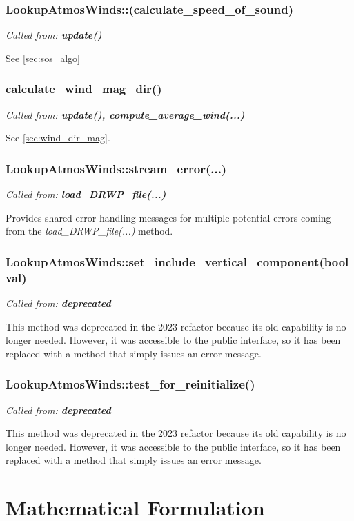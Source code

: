 \documentclass[11pt,fleqn]{report}
\begin{document}
\subsubsection{LookupAtmosWinds::(calculate\_speed\_of\_sound)}
\textit{Called from:  \textbf{update()}}

See \ref{sec:sos_algo}

\subsubsection{calculate\_wind\_mag\_dir()}
\textit{Called from:  \textbf{update(), compute\_average\_wind(...)}}

See \ref{sec:wind_dir_mag}.

\subsubsection{LookupAtmosWinds::stream\_error(...)}
\textit{Called from:  \textbf{load\_DRWP\_file(...)}}

Provides shared error-handling messages for multiple potential errors coming
from the \textit{load\_DRWP\_file(...)} method.

\subsubsection{LookupAtmosWinds::set\_include\_vertical\_component(bool val)}
\textit{Called from:  \textbf{deprecated}}

This method was deprecated in the 2023 refactor because its old capability is
no longer needed. However, it was accessible to the public interface, so it has
been replaced with a method that simply issues an error message.

\subsubsection{LookupAtmosWinds::test\_for\_reinitialize()}
\textit{Called from:  \textbf{deprecated}}

This method was deprecated in the 2023 refactor because its old capability is
no longer needed. However, it was accessible to the public interface, so it has
been replaced with a method that simply issues an error message.



\section{Mathematical Formulation}
\end{document}

